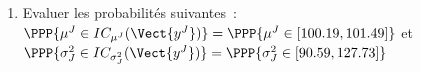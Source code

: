 \documentclass[10pt]{report}
\begin{document}
\begin{exercice}
\begin{enumerate}
\begin{center}
\begin{tabular}{c|cc|cc}
        $[77.91,114.13]$
         & 
    
        $1$
        
    \\ \cline{1-5}

    
        Moyenne
         & 
    
        
         & 
    
        $94.86\%$
         & 
    
        
         & 
    
        $92.02\%$
        
    \\ 

    \end{tabular}
\end{center}
\item Evaluer les probabilités suivantes~:\\
$\PPP{\mu^J \in IC_{\mu^J}(\Vect{y^J})}=\PPP{\mu^J\in [100.19,101.49]}$ et $\PPP{\sigma^2_J\in IC_{\sigma^2_J}(\Vect{y^J})}=\PPP{\sigma^2_J\in [90.59,127.73]}$

\end{enumerate}
\end{exercice}
\end{document}
